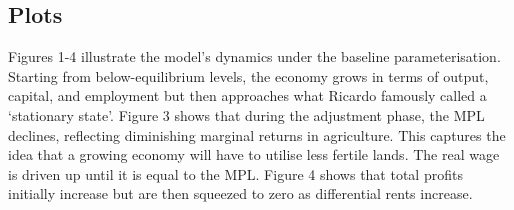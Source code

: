 \documentclass[
  letterpaper,
  DIV=11,
  numbers=noendperiod]{scrreprt}
\begin{document}
\subsection{Plots}\label{plots-11}

Figures 1-4 illustrate the model's dynamics under the baseline
parameterisation. Starting from below-equilibrium levels, the economy
grows in terms of output, capital, and employment but then approaches
what Ricardo famously called a `stationary state'. Figure 3 shows that
during the adjustment phase, the MPL declines, reflecting diminishing
marginal returns in agriculture. This captures the idea that a growing
economy will have to utilise less fertile lands. The real wage is driven
up until it is equal to the MPL. Figure 4 shows that total profits
initially increase but are then squeezed to zero as differential rents
increase.
\end{document}

